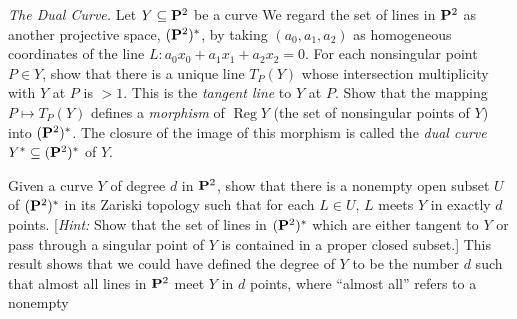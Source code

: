 { \emph{The Dual Curve.} Let $Y\subseteq\mathbf{P}^2$ be a curve\hypertarget{err-I-7-3}{} We regard the set of lines in $\mathbf{P}^2$ as another projective space, $(\mathbf{P}^2)^*$, by taking $(a_0,a_1,a_2)$ as homogeneous coordinates of the line $L\colon a_0x_0+a_1x_1+a_2x_2=0$. For each nonsingular point $P\in Y$, show that there is a unique line $T_P(Y)$ whose intersection multiplicity with $Y$ at $P$ is $>1$. This is the \emph{tangent line} to $Y$ at $P$. Show that the mapping $P\mapsto T_P(Y)$ defines a \emph{morphism} of $\operatorname{Reg}Y$ (the set of nonsingular points of $Y$) into $(\mathbf{P}^2)^*$. The closure of the image of this morphism is called the \emph{dual curve} $Y^*\subseteq(\mathbf{P}^2)^*$ of $Y$.

 Given a curve $Y$ of degree $d$ in $\mathbf{P}^2$, show that there is a nonempty open subset $U$ of $(\mathbf{P}^2)^*$ in its Zariski topology such that for each $L\in U$, $L$ meets $Y$ in exactly $d$ points. [\emph{Hint:} Show that the set of lines in $(\mathbf{P}^2)^*$ which are either tangent to $Y$ or pass through a singular point of $Y$ is contained in a proper closed subset.] This result shows that we could have defined the degree of $Y$ to be the number $d$ such that almost all lines in $\mathbf{P}^2$ meet $Y$ in $d$ points, where \textquotedblleft{}almost all\textquotedblright{} refers to a nonempty}
